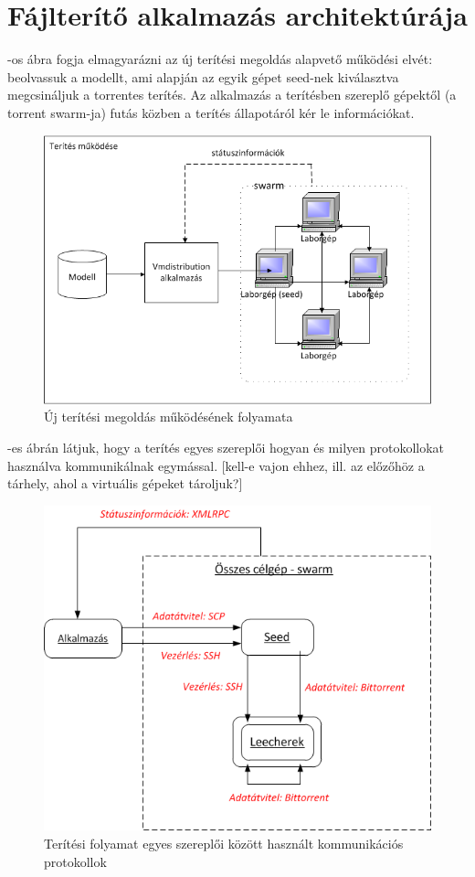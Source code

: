 \section{Fájlterítő alkalmazás architektúrája}
\label{design_apparchi}

-os ábra fogja elmagyarázni az új terítési megoldás alapvető működési elvét: beolvassuk a modellt, ami alapján az egyik gépet seed-nek kiválasztva megcsináljuk a torrentes terítés. Az alkalmazás a terítésben szereplő gépektől (a torrent swarm-ja) futás közben a terítés állapotáról kér le információkat.

\begin{figure}[ht]
	\centering
	\includegraphics[width=130mm, keepaspectratio]{figures/design_overview.png}
	\caption{Új terítési megoldás működésének folyamata}
	\label{fig:designoverview}
\end{figure}

-es ábrán látjuk, hogy a terítés egyes szereplői hogyan és milyen protokollokat használva kommunikálnak egymással. [kell-e vajon ehhez, ill. az előzőhöz a tárhely, ahol a virtuális gépeket tároljuk?]

\begin{figure}[ht]
	\centering
	\includegraphics[width=140mm, keepaspectratio]{figures/design_protocols.png}
	\caption{Terítési folyamat egyes szereplői között használt kommunikációs protokollok}
	\label{fig:designprotocols}
\end{figure}

